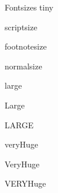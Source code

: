 \documentclass[final]{beamer}
\title[\PosterTitle]{\PosterTitle}
\author[\PosterAuthors]{\PosterAuthors}
\institute[\UniName]{\UniDeptName, \UniName}
\date{\PresentationDate}
\begin{document}
\begin{frame}{} 
  \vfill
  \begin{block}{\large Fontsizes}
    \centering
    {\tiny tiny}\par
    {\scriptsize scriptsize}\par
    {\footnotesize footnotesize}\par
    {\normalsize normalsize}\par
    {\large large}\par
    {\Large Large}\par
    {\LARGE LARGE}\par
    {\veryHuge veryHuge}\par
    {\VeryHuge VeryHuge}\par
    {\VERYHuge VERYHuge}\par
  \end{block}
  \vfill
\end{frame}
\end{document}
